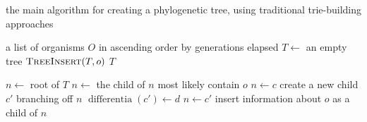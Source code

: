 \begin{algorithm}[h]
    \caption{the main algorithm for creating a phylogenetic tree, using traditional trie-building approaches}
    \label{alg:old}
    \begin{algorithmic}[1]
        \Require a list of organisms $O$ in ascending order by generations elapsed
            \State $T \gets$ an empty tree
                \State $\textsc{TreeInsert}(T, o)$
            \EndFor
            \State \Return $T$
        \EndFunction

            \State $n \gets$ root of $T$
                    \State $n \gets$ the child of $n$ most likely contain $o$
                \EndWhile
                    \State $n \gets c$
                \Else 
                    \State create a new child $c'$ branching off $n$ 
                    \State $\operatorname{differentia}(c') \gets d$
                    \State $n \gets c'$
                \EndIf
            \EndFor
            \State insert information about $o$ as a child of $n$
        \EndFunction
    \end{algorithmic}
\end{algorithm}